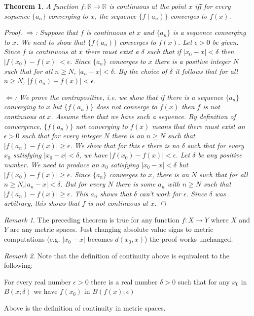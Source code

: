 \documentclass[11pt,a4paper]{report}
\theoremstyle{plain}
\newtheorem{thm}{Theorem}[section]
\theoremstyle{definition}
\theoremstyle{remark}
\newtheorem*{rem}{Remark}
\begin{document}
\begin{thm}
A function $f\colon\mathbb{R}\to\mathbb{R}$ is \textit{continuous} at the point $x$ iff for every sequence $\{a_n\}$ converging to $x$, the sequence $\{f(a_n)\}$ converges to $f(x)$.
\begin{proof}
$\Rightarrow$: Suppose that $f$ is continuous at $x$ and $\{a_n\}$ is a sequence converging to $x$. We need to show that $\{f(a_n)\}$ converges to $f(x)$.  Let $\epsilon>0$ be given. Since $f$ is continuous at $x$ there must exist a $\delta$ such that if $|x_0 - x|<\delta$ then $|f(x_0) - f(x)| < \epsilon$.  Since $\{a_n\}$ converges to $x$ there is a positive integer $N$ such that for all $n\geq N$, $|a_n - x| < \delta$. By the choice of $\delta$ it follows that for all $n\geq N$, $|f(a_n) - f(x)| < \epsilon$.

$\Leftarrow$: We prove the contrapositive, i.e. we show that if there is a sequence $\{a_n\}$ converging to $x$ but $\{f(a_n)\}$ does not converge to $f(x)$ then $f$ is not continuous at $x$.  Assume then that we have such a sequence. By definition of convergence, $\{f(a_n)\}$ not converging to $f(x)$ means that there must exist an $\epsilon>0$ such that for every integer $N$ there is an $n\geq N$ such that \mbox{$|f(a_n) - f(x)| \geq \epsilon$.}  We show that for this $\epsilon$ there is no $\delta$ such that for every $x_0$ satisfying $|x_0-x|<\delta$, we have $|f(x_0) - f(x)| < \epsilon$.  Let $\delta$ be any positive number. We need to produce an $x_0$ satisfying $|x_0-x|<\delta$ but $|f(x_0) - f(x)| \geq \epsilon$.  Since $\{a_n\}$ converges to $x$, there is an $N$ such that for all $n\geq N$,$|a_n-x|<\delta$.  But for every $N$ there is some $a_n$ with $n\geq N$ such that $|f(a_n) - f(x)| \geq \epsilon$. This $a_n$ shows that $\delta$ can't work for $\epsilon$.  Since $\delta$ was arbitrary, this shows that $f$ is not continuous at $x$.
\end{proof}
\end{thm}
\begin{rem}
The preceding theorem is true for any function $f\colon X \to Y$ where $X$ and $Y$ are any metric spaces.  Just changing absolute value signs to metric computations (e.g. $|x_0 - x|$ becomes $d(x_0,x)$) the proof works unchanged.
\end{rem}
\begin{rem}
Note that the definition of continuity above is equivalent to the following:
\begin{adjustwidth}{.5cm}{}
For every real number $\epsilon>0$ there is a real number $\delta>0$ such that for any $x_0$ in $B(x;\delta)$ we have $f(x_0)$ in $B(f(x); \epsilon)$
\end{adjustwidth}
Above is the definition of continuity in metric spaces.
\end{rem}
\end{document}
